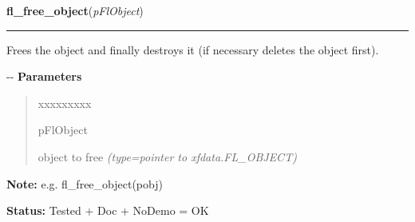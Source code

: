 \hspace{.8\funcindent}\begin{boxedminipage}{\funcwidth}

    \raggedright \textbf{fl\_free\_object}(\textit{pFlObject})

    \vspace{-1.5ex}

    \rule{\textwidth}{0.5\fboxrule}
\setlength{\parskip}{2ex}

Frees the object and finally destroys it (if necessary deletes the
object first).

-{}-
\setlength{\parskip}{1ex}
      \textbf{Parameters}
      \vspace{-1ex}

      \begin{quote}
        \begin{Ventry}{xxxxxxxxx}

          \item[pFlObject]


object to free
            {\it (type=pointer to xfdata.FL\_OBJECT)}

        \end{Ventry}

      \end{quote}

\textbf{Note:} 
e.g. fl\_free\_object(pobj)


\textbf{Status:} 
Tested + Doc + NoDemo = OK


    \end{boxedminipage}

    \label{xformslib:flbasic:fl_delete_object}

    \vspace{0.5ex}

